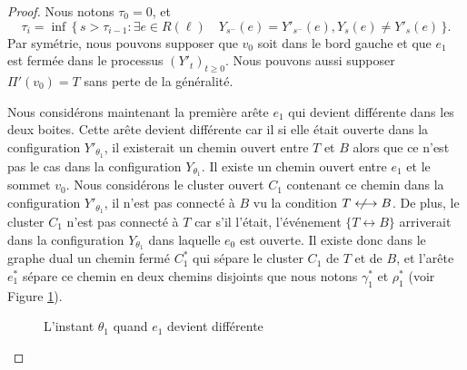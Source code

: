 \documentclass[titlepage,a4paper,12pt]{article}
\newcounter{cor}
\newcommand{\nlongleftrightarrow}{\longleftrightarrow \kern-15pt\not \kern15pt}
\begin{document}
\begin{proof}
Nous notons $\tau_0 = 0$, et $$\tau_i = \inf \, \big\{\,s > \tau_{i-1}: \exists e \in R(\ell)\quad Y_{s^-}(e) = Y'_{s^-}(e),Y_s(e) \neq Y'_s(e)\,\big\}.$$ Par symétrie, nous pouvons supposer que $v_0$ soit dans le bord gauche et que $e_1$ est fermée dans le processus $(Y'_t)_{t\geqslant 0}$. Nous pouvons aussi supposer $\Pi'(v_0)=T$ sans perte de la généralité. 

Nous considérons maintenant la première arête $e_1$ qui devient différente dans les deux boites. Cette arête devient différente car il si elle était ouverte dans la configuration $Y'_{\theta_1}$, il existerait un chemin ouvert entre $T$ et $B$ alors que ce n'est pas le cas dans la configuration $Y_{\theta_1}$. Il existe un chemin ouvert entre $e_1$ et le sommet $v_0$. Nous considérons le cluster ouvert $C_1$ contenant ce chemin dans la configuration $Y'_{\theta_1}$, il n'est pas connecté à $B$ vu la condition $T\nlongleftrightarrow B$. De plus, le cluster $C_1$ n'est pas connecté à $T$ car s'il l'était, l'événement $\{T\longleftrightarrow B\}$ arriverait dans la configuration $Y_{\theta_1}$ dans laquelle $e_0$ est ouverte. Il existe donc dans le graphe dual un chemin fermé $C^*_1$ qui sépare le cluster $C_1$ de $T$ et de $B$, et l'arête $e^*_1$ sépare ce chemin en deux chemins disjoints que nous notons $\gamma_1^*$ et $\rho_1^*$ (voir Figure \ref{fig:e1}). 
\begin{figure}[h]
\begin{minipage}{0.45\linewidth}
\center
{}
\end{minipage}
\begin{minipage}{0.45\linewidth}
\center
{}
\end{minipage}
\caption{L'instant $\theta_1$ quand $e_1$ devient différente}
\label{fig:e1}
\end{figure}


\end{proof}
\end{document}
